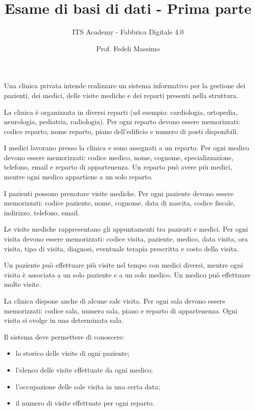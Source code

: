 \documentclass[a4paper,12pt]{article}
\title{Esame di basi di dati - Prima parte}
\author{ITS Academy - Fabbrica Digitale 4.0}
\date{Prof. Fedeli Massimo}
\begin{document}
	
	\maketitle
	
	Una clinica privata intende realizzare un sistema informativo per la gestione dei pazienti, dei medici, delle visite mediche e dei reparti presenti nella struttura.
	
	La clinica è organizzata in diversi reparti (ad esempio: cardiologia, ortopedia, neurologia, pediatria, radiologia). Per ogni reparto devono essere memorizzati: codice reparto, nome reparto, piano dell’edificio e numero di posti disponibili.
	
	I medici lavorano presso la clinica e sono assegnati a un reparto. Per ogni medico devono essere memorizzati: codice medico, nome, cognome, specializzazione, telefono, email e reparto di appartenenza. Un reparto può avere più medici, mentre ogni medico appartiene a un solo reparto.
	
	I pazienti possono prenotare visite mediche. Per ogni paziente devono essere memorizzati: codice paziente, nome, cognome, data di nascita, codice fiscale, indirizzo, telefono, email.
	
	Le visite mediche rappresentano gli appuntamenti tra pazienti e medici. Per ogni visita devono essere memorizzati: codice visita, paziente, medico, data visita, ora visita, tipo di visita, diagnosi, eventuale terapia prescritta e costo della visita.
	
	Un paziente può effettuare più visite nel tempo con medici diversi, mentre ogni visita è associata a un solo paziente e a un solo medico. Un medico può effettuare molte visite.
	
	La clinica dispone anche di alcune sale visita. Per ogni sala devono essere memorizzati: codice sala, numero sala, piano e reparto di appartenenza. Ogni visita si svolge in una determinata sala.
	
	Il sistema deve permettere di conoscere:
	\begin{itemize}
		\item lo storico delle visite di ogni paziente;
		\item l’elenco delle visite effettuate da ogni medico;
		\item l’occupazione delle sale visita in una certa data;
		\item il numero di visite effettuate per ogni reparto.
	\end{itemize}
	
	\bigskip
	
\end{document}
